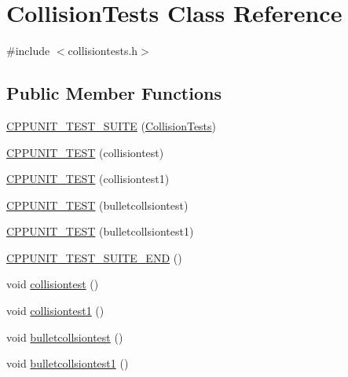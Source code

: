 \hypertarget{classCollisionTests}{
\section{CollisionTests Class Reference}
\label{classCollisionTests}
}


{\ttfamily \#include $<$collisiontests.h$>$}\subsection*{Public Member Functions}
\begin{DoxyCompactItemize}
\item 
\hyperlink{classCollisionTests_a542155fcf2acb7a46506e5924f32de86}{CPPUNIT\_\-TEST\_\-SUITE} (\hyperlink{classCollisionTests}{CollisionTests})
\item 
\hyperlink{classCollisionTests_a6f2e114f6c020b7650a9357386a85084}{CPPUNIT\_\-TEST} (collisiontest)
\item 
\hyperlink{classCollisionTests_aa582a183125d00737483f6ecf9ba1e81}{CPPUNIT\_\-TEST} (collisiontest1)
\item 
\hyperlink{classCollisionTests_a516a73cfbac5616bd64518c97b922fb8}{CPPUNIT\_\-TEST} (bulletcollsiontest)
\item 
\hyperlink{classCollisionTests_a71fe8a9d6ecb756ffc41dc8cce239944}{CPPUNIT\_\-TEST} (bulletcollsiontest1)
\item 
\hyperlink{classCollisionTests_ad9399d823f41c3dcf60d83b3d7b96574}{CPPUNIT\_\-TEST\_\-SUITE\_\-END} ()
\item 
void \hyperlink{classCollisionTests_af5e85370e1846385a61da97eeb7e8b28}{collisiontest} ()
\item 
void \hyperlink{classCollisionTests_a787429e5b0361daacf1df123560ca7c5}{collisiontest1} ()
\item 
void \hyperlink{classCollisionTests_a5e00b872973bc79d09ee1dbc47550ab1}{bulletcollsiontest} ()
\item 
void \hyperlink{classCollisionTests_a2e58eacdce778bf4cb996b5cc0388c3f}{bulletcollsiontest1} ()
\end{DoxyCompactItemize}


